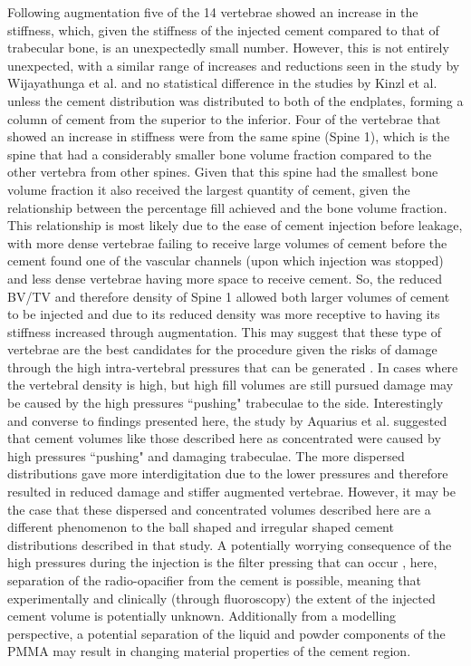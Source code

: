Following augmentation five of the 14 vertebrae showed an increase in the
stiffness, which, given the stiffness of the injected cement compared to that
of trabecular bone, is an unexpectedly small number. However, this is not
entirely unexpected, with a similar range of increases and reductions seen in
the study by Wijayathunga et al. \cite{Wijayathunga2008} and no statistical
difference in the studies by Kinzl et al.
\cite{Kinzl2012,kinzl2013experimentally,Kinzl2012a} unless the cement
distribution was distributed to both of the endplates, forming a column of
cement from the superior to the inferior.
Four of the vertebrae that showed an increase in stiffness were
from the same spine (Spine 1), which is the spine that had a considerably
smaller bone volume fraction compared to the other vertebra from other spines.
Given that this spine had the smallest bone volume fraction it also received
the largest quantity of cement, given the relationship between the percentage
fill achieved and the bone volume fraction.  This relationship is most likely
due to the ease of cement injection before leakage, with more dense vertebrae
failing to receive large volumes of cement before the cement found one of the
vascular channels (upon which injection was stopped) and less dense vertebrae
having more space to receive cement. So, the reduced BV/TV and therefore
density of Spine 1 allowed both larger volumes of cement to be injected and due
to its reduced density was more receptive to having its stiffness increased
through augmentation. This may suggest that these type of vertebrae are the
best candidates for the procedure given the risks of damage through the high
intra-vertebral pressures that can be generated
\cite{aquarius2014prophylactic,gravius2009intravertebral}. In cases where the
vertebral density is high, but high fill volumes are still pursued damage may
be caused by the high pressures ``pushing" trabeculae to the side.
Interestingly and converse to findings presented here, the study by Aquarius et
al. \cite{aquarius2014prophylactic} suggested that cement volumes like those
described here as concentrated were caused by high pressures ``pushing"
and damaging trabeculae. The more dispersed distributions gave more
interdigitation due to the lower pressures and therefore resulted in reduced
damage and stiffer augmented vertebrae. However, it may be the case that these
dispersed and concentrated volumes described here are a different phenomenon to
the ball shaped and irregular shaped cement distributions described in that
study. A potentially worrying consequence of the high pressures during the
injection is the filter pressing that can occur
\cite{tarsuslugil2013development}, here, separation of the radio-opacifier from
the cement is possible, meaning that experimentally and clinically (through
fluoroscopy) the extent of the injected cement volume is potentially unknown.
Additionally from a modelling perspective, a potential separation of the liquid
and powder components of the PMMA may result in changing material properties of
the cement region.

